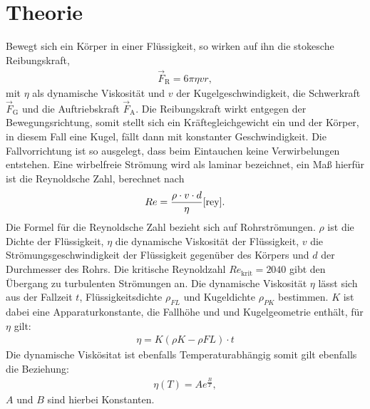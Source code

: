 \section{Theorie}
\label{sec:theorie}

\cite{sample}
Bewegt sich ein Körper in einer Flüssigkeit, so wirken auf
ihn die stokesche Reibungskraft,
\begin{align}
  \vec{F}_{\mathrm{R}}=6\pi\eta v r,
\end{align}
mit $\eta$ als dynamische Viskosität und $v$ der Kugelgeschwindigkeit,
die Schwerkraft $\vec{F}_{\mathrm{G}}$ und die Auftriebskraft $\vec{F}_{\mathrm{A}}$.
Die Reibungskraft wirkt entgegen der Bewegungsrichtung, somit stellt sich ein
Kräftegleichgewicht ein und der Körper, in diesem Fall eine Kugel,
fällt dann mit konstanter Geschwindigkeit.
Die Fallvorrichtung ist so ausgelegt, dass beim Eintauchen
keine Verwirbelungen entstehen. Eine wirbelfreie Strömung
wird als laminar bezeichnet, ein Maß hierfür ist die Reynoldsche Zahl, berechnet nach
\begin{align}
Re=\frac{\rho \cdot v \cdot d}{\eta}\label{eqn:rey}\text{\cite{rey}}.
\end{align}
Die Formel für die Reynoldsche Zahl bezieht sich auf Rohrströmungen.
$\rho$ ist die Dichte der Flüssigkeit, $\eta$ die dynamische Viskosität der
Flüssigkeit, $v$ die Strömungsgeschwindigkeit der Flüssigkeit
gegenüber des Körpers und $d$ der Durchmesser des Rohrs.
Die kritische Reynoldzahl $Re_{\mathrm{krit}}=2040$ gibt
den Übergang zu turbulenten Strömungen an.\cite{reykrit}
Die dynamische Viskosität $\eta$ lässt sich
aus der Fallzeit $t$, Flüssigkeitsdichte $\rho_{FL}$ und Kugeldichte $\rho_{PK}$
bestimmen. $K$ ist dabei eine  Apparaturkonstante, die Fallhöhe
und und Kugelgeometrie enthält, für $\eta$ gilt:
\begin{align}
  \eta=K(\rho{K}-\rho{FL})\cdot t \label{eqn:vis}
\end{align}
Die dynamische Viskösitat ist ebenfalls Temperaturabhängig somit gilt ebenfalls die Beziehung:
\begin{align}
  \eta(T)= A e^{\frac{B}{T}}\label{eqn:andra},
\end{align}
$A$ und $B$ sind hierbei Konstanten.
